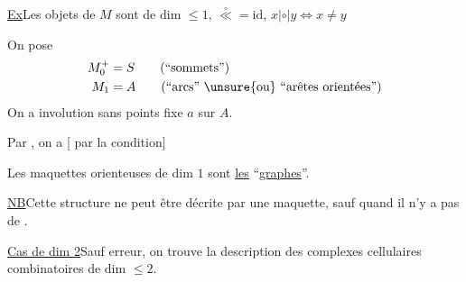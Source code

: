 \uline{Ex}\quad Les objets de $M$ sont de dim $\leq1$, $\overset{\circ}{\ll}=\mathrm{id}$, $x|\circ|y\Longleftrightarrow x\ne y$


On pose
\[
\begin{aligned}
M_0^+&=S\qquad\text{(``sommets'')}\\
M_1&=A\qquad\text{(``arcs'' \unsure{ou} ``arêtes orientées'')}
\end{aligned}
\]
On a involution sans points fixe $a$ sur $A$.

 Par , on a
[ par la condition]

Les maquettes orienteuses de dim \inserted{$\leq$}$1$ sont \uline{les} ``\uline{graphes}''.

\uline{NB}\quad Cette structure ne peut être décrite par une maquette, sauf quand il n'y a pas de  .

\uline{Cas  de  dim 2}\quad Sauf erreur, on trouve la description des complexes cellulaires combinatoires de dim $\leq2$.



